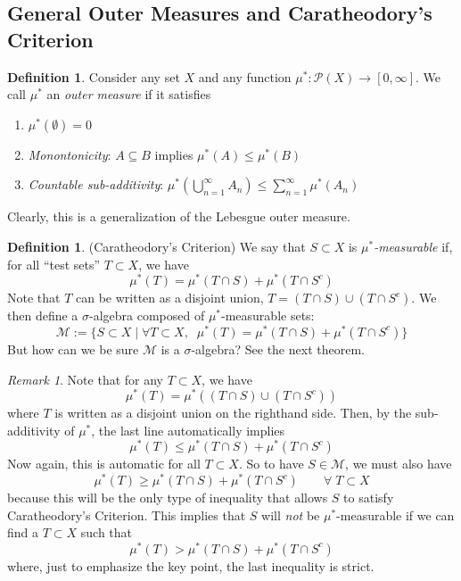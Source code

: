 \documentclass[12pt]{article}
\theoremstyle{plain}
\theoremstyle{definition}
\newtheorem{defn}[thm]{Definition}
\theoremstyle{remark}
\newtheorem*{rmk}{Remark}
\begin{document}
\newpage
\subsection{General Outer Measures and Caratheodory's Criterion}

\begin{defn} 
\label{outermeas}
Consider any set $X$ and any function $\mu^*:\mathscr{P}(X)\rightarrow[0,\infty]$. We call $\mu^*$ an \emph{outer measure} if it satisfies
\begin{enumerate}
    \item $\mu^*(\emptyset)=0$
    \item \emph{Monontonicity}: $A\subseteq B$ implies $\mu^*(A) \leq \mu^*(B)$
    \item \emph{Countable sub-additivity}: $\mu^*\left(\bigcup_{n=1}^\infty A_n\right) \leq \sum^\infty_{n=1} \mu^*(A_n)$
\end{enumerate}
Clearly, this is a generalization of the Lebesgue outer measure.
\end{defn}

\begin{defn} 
\label{caracrit}    
(Caratheodory's Criterion)
We say that $S\subset X$ is \emph{$\mu^*$-measurable} if, for all ``test sets'' $T\subset X$, we have
\[
    \mu^*(T) = \mu^*(T\cap S) + \mu^*(T\cap S^c) 
\]
Note that $T$ can be written as a disjoint union, $T=(T\cap S) \cup (T\cap S^c)$. We then define a $\sigma$-algebra composed of $\mu^*$-measurable sets:
\[
    \mathscr{M} 
    := \{S\subset X \; | \; \forall T\subset X, \;\;
        \mu^*(T) = \mu^*(T\cap S) + \mu^*(T\cap S^c) 
    \}
\]
But how can we be sure $\mathscr{M}$ is a $\sigma$-algebra? See the next theorem.
\end{defn}
\begin{rmk}
Note that for any $T\subset X$, we have
\[
    \mu^*(T) = \mu^*\left((T\cap S)\cup(T\cap S^c)\right)
\]
where $T$ is written as a disjoint union on the righthand side. Then, by the sub-additivity of $\mu^*$, the last line automatically implies 
\begin{equation}
    \mu^*(T) 
    \leq \mu^*\left(T\cap S\right) + 
    \mu^*\left(T\cap S^c\right)
\end{equation}
Now again, this is automatic for all $T\subset X$. So to have $S\in\mathscr{M}$, we must also have
\begin{equation}
    \mu^*(T) 
    \geq \mu^*\left(T\cap S\right) + 
    \mu^*\left(T\cap S^c\right)
    \qquad \forall \; T\subset X
\end{equation}
because this will be the only type of inequality that allows $S$ to satisfy Caratheodory's Criterion. This implies that $S$ will \emph{not} be $\mu^*$-measurable if we can find a $T\subset X$ such that 
\begin{equation}
    \mu^*(T) 
    > \mu^*\left(T\cap S\right) + 
    \mu^*\left(T\cap S^c\right)
\end{equation}
where, just to emphasize the key point, the last inequality is strict.
\end{rmk}
\end{document}

